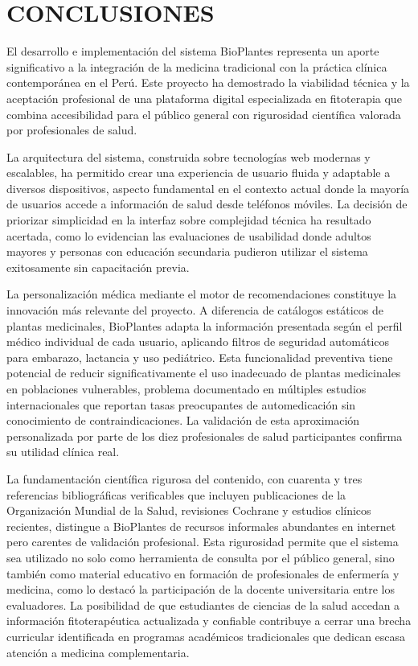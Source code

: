 \documentclass[12pt,a4paper]{article}
\begin{document}
\section{CONCLUSIONES}

El desarrollo e implementación del sistema BioPlantes representa un aporte significativo a la integración de la medicina tradicional con la práctica clínica contemporánea en el Perú. Este proyecto ha demostrado la viabilidad técnica y la aceptación profesional de una plataforma digital especializada en fitoterapia que combina accesibilidad para el público general con rigurosidad científica valorada por profesionales de salud.

La arquitectura del sistema, construida sobre tecnologías web modernas y escalables, ha permitido crear una experiencia de usuario fluida y adaptable a diversos dispositivos, aspecto fundamental en el contexto actual donde la mayoría de usuarios accede a información de salud desde teléfonos móviles. La decisión de priorizar simplicidad en la interfaz sobre complejidad técnica ha resultado acertada, como lo evidencian las evaluaciones de usabilidad donde adultos mayores y personas con educación secundaria pudieron utilizar el sistema exitosamente sin capacitación previa.

La personalización médica mediante el motor de recomendaciones constituye la innovación más relevante del proyecto. A diferencia de catálogos estáticos de plantas medicinales, BioPlantes adapta la información presentada según el perfil médico individual de cada usuario, aplicando filtros de seguridad automáticos para embarazo, lactancia y uso pediátrico. Esta funcionalidad preventiva tiene potencial de reducir significativamente el uso inadecuado de plantas medicinales en poblaciones vulnerables, problema documentado en múltiples estudios internacionales que reportan tasas preocupantes de automedicación sin conocimiento de contraindicaciones. La validación de esta aproximación personalizada por parte de los diez profesionales de salud participantes confirma su utilidad clínica real.

La fundamentación científica rigurosa del contenido, con cuarenta y tres referencias bibliográficas verificables que incluyen publicaciones de la Organización Mundial de la Salud, revisiones Cochrane y estudios clínicos recientes, distingue a BioPlantes de recursos informales abundantes en internet pero carentes de validación profesional. Esta rigurosidad permite que el sistema sea utilizado no solo como herramienta de consulta por el público general, sino también como material educativo en formación de profesionales de enfermería y medicina, como lo destacó la participación de la docente universitaria entre los evaluadores. La posibilidad de que estudiantes de ciencias de la salud accedan a información fitoterapéutica actualizada y confiable contribuye a cerrar una brecha curricular identificada en programas académicos tradicionales que dedican escasa atención a medicina complementaria.
\end{document}

